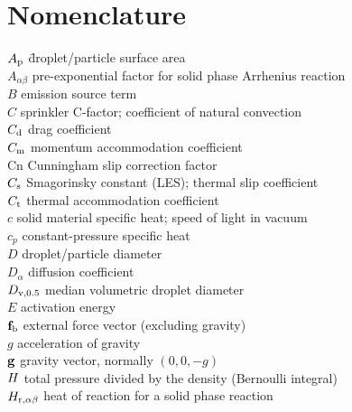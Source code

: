 

\chapter{Nomenclature}
\label{nomenclature}

\begin{tabbing}
$A_{\rm p}$ \hspace{1in}  \= droplet/particle surface area \\
$A_{\alpha\beta}$         \> pre-exponential factor for solid phase Arrhenius reaction \\
$B$                       \> emission source term \\
$C$                       \> sprinkler C-factor; coefficient of natural convection \\
$C_{\rm d}$               \> drag coefficient \\
$C_{\rm m}$               \> momentum accommodation coefficient \\
Cn                        \> Cunningham slip correction factor \\
$C_{\rm s}$               \> Smagorinsky constant (LES); thermal slip coefficient  \\
$C_{\rm t}$               \> thermal accommodation coefficient \\
$c$                       \> solid material specific heat; speed of light in vacuum \\
$c_p$                     \> constant-pressure specific heat \\
$D$                       \> droplet/particle diameter   \\
$D_{\alpha}$              \> diffusion coefficient \\
$D_{\rm v,0.5}$           \> median volumetric droplet diameter \\
$E$                       \> activation energy \\
${\mathbf{f}}_{\rm b}$            \> external force vector (excluding gravity) \\
$g$                       \> acceleration of gravity \\
${\mathbf{g}}$                     \> gravity vector, normally $(0,0,-g)$ \\
$H$                      \> total pressure divided by the density (Bernoulli integral)\\
$H_{{\rm r},\alpha\beta}$ \> heat of reaction for a solid phase reaction     \\

\end{tabbing}

